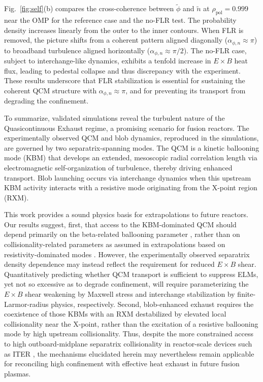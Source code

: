 \documentclass[aps,prl,twocolumn,superscriptaddress]{revtex4-2}
\def  \rpol {\rho_\mathrm{pol}}
\begin{document}
Fig.~\ref{fig:self}(b) compares the cross-coherence between $\tilde{\phi}$ and $\tilde{n}$ at $\rpol=0.999$ near the OMP for the reference case and the no-FLR test.
The probability density increases linearly from the outer to the inner contours.
When FLR is removed, the picture shifts from a coherent pattern aligned diagonally  ($\alpha_{\phi,n}\approx \pi$) to broadband turbulence aligned horizontally ($\alpha_{\phi,n}\approx \pi/2$).
The no-FLR case, subject to interchange-like dynamics, exhibits a tenfold increase in $E\times B$ heat flux, leading to pedestal collapse and thus discrepancy with the experiment.
These results underscore that FLR stabilization is essential for sustaining the coherent QCM structure with $\alpha_{\phi,n}\approx \pi$, and for preventing its transport from degrading the confinement.

{To summarize, validated simulations reveal the turbulent nature of the Quasicontinuous Exhaust regime, a promising scenario for fusion reactors.
The experimentally observed QCM and blob dynamics, reproduced in the simulations, are governed by two separatrix-spanning modes.
The QCM is a kinetic ballooning mode (KBM) that develops an extended, mesoscopic radial correlation length via electromagnetic self-organization of turbulence, thereby driving enhanced transport.
Blob launching occurs via interchange dynamics when this upstream KBM activity interacts with a resistive mode originating from the X-point region (RXM).}

{This work provides a sound physics basis for extrapolations to future reactors.
Our results suggest, first, that access to the KBM-dominated QCM should depend primarily on the beta-related ballooning parameter \cite{dunne2024quasi,faitsch2025quasi}, rather than on collisionality-related parameters \cite{Zeiler1998,scott2005drift,eich2020turbulence} as assumed in extrapolations based on resistivity-dominated modes \cite{faitsch2023analysis}.
However, the experimentally observed separatrix density dependence \cite{faitsch2023analysis,miller2025determination} may instead reflect the requirement for reduced $E\times B$ shear.
Quantitatively predicting whether QCM transport is sufficient to suppress ELMs, yet not so excessive as to degrade confinement, will require parameterizing the $E\times B$ shear weakening by Maxwell stress and interchange stabilization by finite-Larmor-radius physics, respectively.
Second, blob-enhanced exhaust requires the coexistence of those KBMs with an RXM destabilized by elevated local collisionality near the X-point, rather than the excitation of a resistive ballooning mode by high upstream collisionality.
Thus, despite the more constrained access to high outboard-midplane separatrix collisionality in reactor-scale devices such as ITER \cite{labit2019dependence,faitsch2025quasi}, the mechanisms elucidated herein may nevertheless remain applicable for reconciling high confinement with effective heat exhaust in future fusion plasmas.
}
\end{document}
